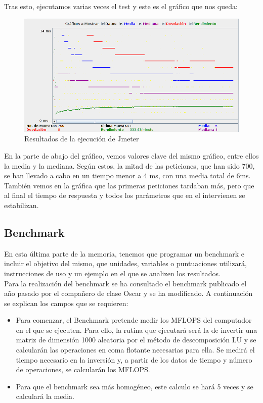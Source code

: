 \begin{itemize}
\begin{itemize}
		Tras esto, ejecutamos varias veces el test y este es el gráfico que nos queda:\\
		
		\begin{figure}[H]
			\centering
			\includegraphics[width=0.7\linewidth]{GraficoJmeter}
			\caption[Grafico Jmeter]{Resultados de la ejecución de Jmeter}
			\label{fig:GraficoJmeter}
		\end{figure}
		
		En la parte de abajo del gráfico, vemos valores clave del mismo gráfico, entre ellos la media y la mediana. Según estos, la mitad de las peticiones, que han sido 700, se han llevado a cabo en un tiempo menor a 4 ms, con una media total de 6ms. También vemos en la gráfica que las primeras peticiones tardaban más, pero que al final el tiempo de respuesta y todos los parámetros que en el intervienen se estabilizan.

	\end{itemize}
	
	\subsection{Benchmark}
	En esta última parte de la memoria, tenemos que programar un benchmark e incluir el objetivo del mismo, que unidades, variables o puntuaciones utilizará, instrucciones de uso y un ejemplo en el que se analizen los resultados.\\
	
	Para la realización del benchmark se ha consultado el benchmark publicado el año pasado por el compañero de clase Oscar \cite{oscar} y se ha modificado. A continuación se explican los campos que se requieren:\\
	
	\begin{itemize}
		\item Para comenzar, el Benchmark pretende medir los MFLOPS del computador en el que se ejecuten. Para ello, la rutina que ejecutará será la de invertir una matriz de dimensión 1000 aleatoria por el método de descomposición LU y se calcularán las operaciones en coma flotante necesarias para ella. Se medirá el tiempo necesario en la inversión y, a partir de los datos de tiempo y número de operaciones, se calcularán los MFLOPS.
		\item Para que el benchmark sea más homogéneo, este calculo se hará 5 veces y se calculará la media. 
		

\end{itemize}
\end{itemize}

